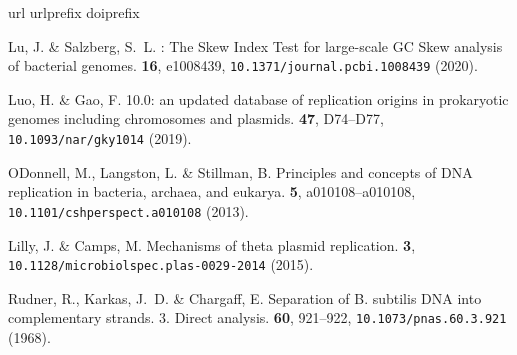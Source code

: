 \documentclass[fleqn,10pt]{wlscirep}
\begin{document}
\begin{thebibliography}{10}
\expandafter\ifx\csname url\endcsname\relax
  \def\url#1{\texttt{#1}}\fi
\expandafter\ifx\csname urlprefix\endcsname\relax\def\urlprefix{URL }\fi
\expandafter\ifx\csname doiprefix\endcsname\relax\def\doiprefix{DOI: }\fi
\providecommand{\bibinfo}[2]{#2}
\providecommand{\eprint}[2][]{\url{#2}}

\bibinfo{author}{Lu, J.} \& \bibinfo{author}{Salzberg, S.~L.}
\newblock \bibinfo{journal}{\bibinfo{title}{{SkewIT}: {The} {Skew} {Index}
  {Test} for large-scale {GC} {Skew} analysis of bacterial genomes}}.
  \textbf{\bibinfo{volume}{16}}, \bibinfo{pages}{e1008439},
  \url{10.1371/journal.pcbi.1008439} (\bibinfo{year}{2020}).

\bibinfo{author}{Luo, H.} \& \bibinfo{author}{Gao, F.}
\newblock \bibinfo{journal}{\bibinfo{title}{{DoriC} 10.0: an updated database
  of replication origins in prokaryotic genomes including chromosomes and
  plasmids}}.
  \textbf{\bibinfo{volume}{47}}, \bibinfo{pages}{D74--D77},
  \url{10.1093/nar/gky1014} (\bibinfo{year}{2019}).

\bibinfo{author}{O{\textquotesingle}Donnell, M.}, \bibinfo{author}{Langston,
  L.} \& \bibinfo{author}{Stillman, B.}
\newblock \bibinfo{journal}{\bibinfo{title}{Principles and concepts of {DNA}
  replication in bacteria, archaea, and eukarya}}.
  \textbf{\bibinfo{volume}{5}}, \bibinfo{pages}{a010108--a010108},
  \url{10.1101/cshperspect.a010108} (\bibinfo{year}{2013}).

\bibinfo{author}{Lilly, J.} \& \bibinfo{author}{Camps, M.}
\newblock \bibinfo{journal}{\bibinfo{title}{Mechanisms of theta plasmid
  replication}}.
  \textbf{\bibinfo{volume}{3}}, \url{10.1128/microbiolspec.plas-0029-2014}
  (\bibinfo{year}{2015}).

\bibinfo{author}{Rudner, R.}, \bibinfo{author}{Karkas, J.~D.} \&
  \bibinfo{author}{Chargaff, E.}
\newblock \bibinfo{journal}{\bibinfo{title}{Separation of {B}. subtilis {DNA}
  into complementary strands. 3. {Direct} analysis.}}
 \textbf{\bibinfo{volume}{60}}, \bibinfo{pages}{921--922},
  \url{10.1073/pnas.60.3.921} (\bibinfo{year}{1968}).


\end{thebibliography}
\end{document}
